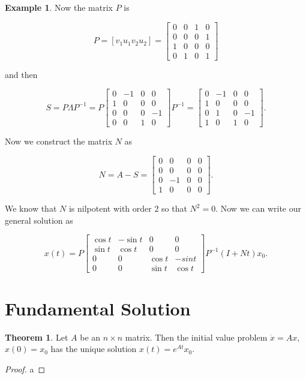 \documentclass[12pt]{article}
\theoremstyle{definition}
\newtheorem*{example}{Example}
\newtheorem{theorem}{Theorem}[section]  %
\begin{document}
\begin{example}
Now the matrix $P$ is

\[
P = [v_1 u_1 v_2 u_2] =
\begin{bmatrix}
0 & 0 & 1 & 0 \\
0 & 0 & 0 & 1 \\
1 & 0 & 0 & 0 \\
0 & 1 & 0 & 1
\end{bmatrix}
\]

and then

\[
S = P \Lambda P^{-1} =
P
\begin{bmatrix}
0 & -1 & 0 & 0 \\
1 & 0 & 0 & 0 \\
0 & 0 & 0 & -1 \\
0 & 0 & 1 & 0
\end{bmatrix}
P^{-1}
=
\begin{bmatrix}
0 & -1 & 0 & 0 \\
1 & 0 & 0 & 0 \\
0 & 1 & 0 & -1 \\
1 & 0 & 1 & 0
\end{bmatrix}.
\]

Now we construct the matrix $N$ as

\[
N = A - S = 
\begin{bmatrix}
0 & 0 & 0 & 0 \\
0 & 0 & 0 & 0 \\
0 & -1 & 0 & 0 \\
1 & 0 & 0 & 0
\end{bmatrix}.
\]

We know that $N$ is nilpotent with order 2 so that $N^2 = 0$. Now we can write our
general solution as

\[
x(t) = P
\begin{bmatrix}
\cos t & -\sin t & 0 & 0 \\
\sin t & \cos t & 0 & 0 \\
0 & 0 & \cos t & -sin t \\
0 & 0 & \sin t & \cos t
\end{bmatrix}
P^{-1} (I + Nt) x_0.
\]

\end{example}

\section{Fundamental Solution}

\begin{theorem}
Let $A$ be an $n \times n$ matrix. Then the initial value problem $\dot x = Ax$, $x(0) = x_0$ has the unique solution
$x(t) = e^{At}x_0$.
\end{theorem}

\begin{proof}
a
\end{proof}
\end{document}
